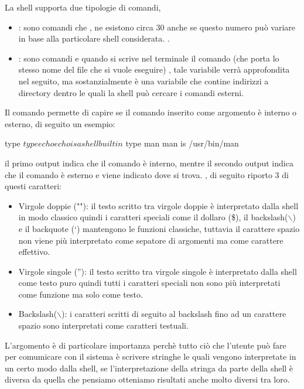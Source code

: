 La shell supporta due tipologie di comandi, 
\begin{itemize}
    \item {}: sono comandi che , ne esistono circa 30 anche se questo numero può variare in base alla particolare shell considerata. .
    \item {}: sono comandi  e quando si scrive nel terminale il comando (che porta lo stesso nome del file che si vuole eseguire) , tale variabile verrà approfondita nel seguito, ma sostanzialmente è una variabile che contine indirizzi a directory dentro le quali la shell può cercare i comandi esterni. 
\end{itemize}
Il comando  permette di capire se il comando inserito come argomento è interno o esterno, di seguito un esempio:
\begin{cmdc}{}{type}
	$ type echo
	echo is a shell builtin
	$ type man
	man is /usr/bin/man
\end{cmdc}

il primo output indica che il comando  è interno, mentre il secondo output indica che il comando  è esterno e viene indicato dove si trova.
, di seguito riporto 3 di questi caratteri:
\begin{itemize}
    \item Virgole doppie (""): il testo scritto tra virgole doppie è interpretato dalla shell in modo classico quindi i caratteri speciali come  il dollaro (\$), il backslash($\backslash$) e il backquote (`) mantengono le funzioni classiche, tuttavia il carattere spazio non viene più interpretato come sepatore di argomenti ma come carattere effettivo.
    \item Virgole singole (''): il testo scritto tra virgole singole è interpretato dalla shell come testo puro quindi tutti i caratteri speciali non sono più interpretati come funzione ma solo come testo.
    \item Backslash($\backslash$): i caratteri scritti di seguito al backslash fino ad un carattere spazio sono interpretati come caratteri testuali. 
\end{itemize}
L'argomento  è di particolare importanza perchè tutto ciò che l'utente può fare per comumicare con il sistema è scrivere stringhe le quali vengono interpretate in un certo modo dalla shell, se l'interpretazione della stringa da parte della shell è diversa da quella che pensiamo otteniamo risultati anche molto diversi tra loro.

